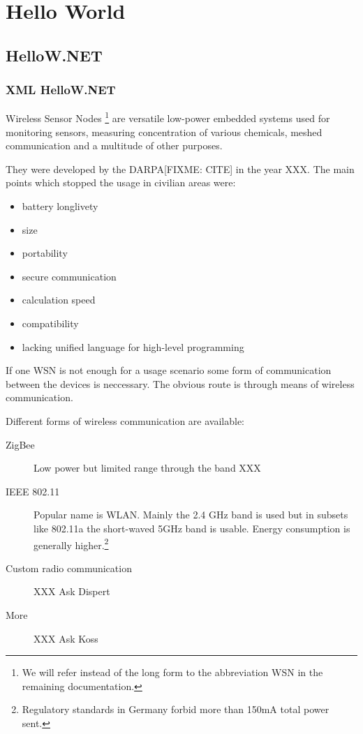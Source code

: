 \section{Hello World}
\subsection{HelloW.NET}
\subsubsection{XML HelloW.NET}

Wireless Sensor Nodes \footnote{We will refer instead of the long form to the abbreviation \textsc{WSN} in the remaining documentation.}
are versatile low-power embedded systems used for monitoring sensors, measuring concentration of various chemicals, meshed communication
and a multitude of other purposes.

They were developed by the DARPA[FIXME: CITE] in the year XXX. The main points which stopped the usage in civilian areas were:

\begin{itemize}
\item battery longlivety
\item size
\item portability
\item secure communication
\item calculation speed
\item compatibility
\item lacking unified language for high-level programming
\end{itemize}

If one \textsc{WSN} is not enough for a usage scenario some form of communication between the devices is neccessary. The obvious
route is through means of wireless communication.

Different forms of wireless communication are available:

\begin{description}
\item[ZigBee] Low power but limited range through the band XXX
\item[IEEE 802.11] Popular name is \textsc{WLAN}. Mainly the 2.4 GHz band is used but in subsets like 802.11a the short-waved 5GHz band is usable.
Energy consumption is generally higher.\footnote{Regulatory standards in Germany forbid more than 150mA total power sent.}
\item[Custom radio communication] XXX Ask Dispert
\item[More] XXX Ask Koss
\end{description}
